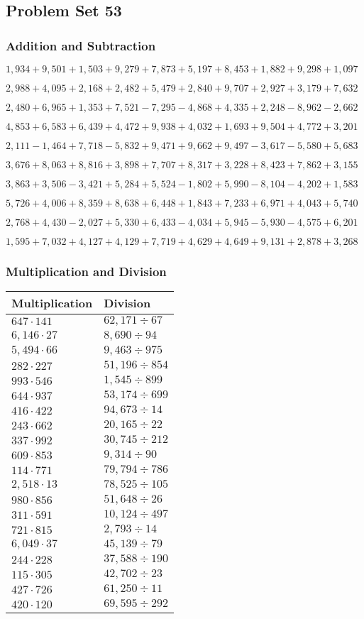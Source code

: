 \hypertarget{problem-set-53-2}{%
\subsection{Problem Set 53}\label{problem-set-53-2}}

\hypertarget{addition-and-subtraction-215}{%
\subsubsection{Addition and
Subtraction}\label{addition-and-subtraction-215}}

\(1,934+9,501+1,503+9,279+7,873+5,197+8,453+1,882+9,298+ 1,097\)

\(2,988+4,095+2,168+2,482+5,479+2,840+9,707+2,927+3,179+7,632\)

\(2,480+6,965+1,353+7,521-7,295-4,868+4,335+2,248-8,962-2,662\)

\(4,853+6,583+6,439+4,472+9,938+4,032+1,693+9,504+4,772+3,201\)

\(2,111-1,464+7,718-5,832+9,471+9,662+9,497-3,617-5,580+5,683\)

\(3,676+8,063+8,816+3,898+7,707+8,317+3,228+8,423+7,862+3,155\)

\(3,863+3,506-3,421+5,284+5,524-1,802+5,990-8,104-4,202+1,583\)

\(5,726+4,006+8,359+8,638+6,448+1,843+7,233+6,971+4,043+5,740\)

\(2,768+4,430-2,027+5,330+6,433-4,034+5,945-5,930-4,575+6,201\)

\(1,595+7,032+4,127+4,129+7,719+4,629+4,649+9,131+2,878+3,268\)

\hypertarget{multiplication-and-division-214}{%
\subsubsection{Multiplication and
Division}\label{multiplication-and-division-214}}

\begin{longtable}[]{@{}ll@{}}
\toprule
Multiplication & Division\tabularnewline
\midrule
\endhead
\(647\cdot141\) & \(62,171÷67\)\tabularnewline
\(6,146\cdot27\) & \(8,690÷94\)\tabularnewline
\(5,494\cdot66\) & \(9,463÷975\)\tabularnewline
\(282\cdot227\) & \(51,196÷854\)\tabularnewline
\(993\cdot546\) & \(1,545÷899\)\tabularnewline
\(644\cdot937\) & \(53,174÷699\)\tabularnewline
\(416\cdot422\) & \(94,673÷14\)\tabularnewline
\(243\cdot662\) & \(20,165÷22\)\tabularnewline
\(337\cdot992\) & \(30,745÷212\)\tabularnewline
\(609\cdot853\) & \(9,314÷90\)\tabularnewline
\(114\cdot771\) & \(79,794÷786\)\tabularnewline
\(2,518\cdot13\) & \(78,525÷105\)\tabularnewline
\(980\cdot856\) & \(51,648÷26\)\tabularnewline
\(311\cdot591\) & \(10,124÷497\)\tabularnewline
\(721\cdot815\) & \(2,793÷14\)\tabularnewline
\(6,049\cdot37\) & \(45,139÷79\)\tabularnewline
\(244\cdot228\) & \(37,588÷190\)\tabularnewline
\(115\cdot305\) & \(42,702÷23\)\tabularnewline
\(427\cdot726\) & \(61,250÷11\)\tabularnewline
\(420\cdot120\) & \(69,595÷292\)\tabularnewline
\bottomrule
\end{longtable}


